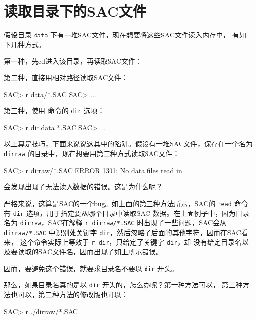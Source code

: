 \section{读取目录下的SAC文件}
\label{sec:read-dir}
假设目录 \texttt{data} 下有一堆SAC文件，现在想要将这些SAC文件读入内存中，
有如下几种方式。

第一种，先cd进入该目录，再读取SAC文件：

第二种，直接用相对路径读取SAC文件：
\begin{SACCode}
SAC> r data/*.SAC
SAC> ...
\end{SACCode}

第三种，使用 命令的 \texttt{dir} 选项：
\begin{SACCode}
SAC> r dir data *.SAC
SAC> ...
\end{SACCode}

以上算是技巧，下面来说说这其中的陷阱。假设有一堆SAC文件，保存在一个名为
\texttt{dirraw} 的目录中，现在想要用第二种方式读取SAC文件：
\begin{SACCode}
SAC> r dirraw/*.SAC
 ERROR 1301: No data files read in.
\end{SACCode}
会发现出现了无法读入数据的错误。这是为什么呢？

严格来说，这算是SAC的一个bug。如上面的第三种方法所示，SAC的
\texttt{read} 命令有 \texttt{dir} 选项，用于指定要从哪个目录中读取SAC
数据。在上面例子中，因为目录名为 \texttt{dirraw}，SAC在解释
\texttt{r dirraw/*.SAC} 时出现了一些问题，SAC会从 \texttt{dirraw/*.SAC}
中识别处关键字 \texttt{dir}，然后忽略了后面的其他字符，因而在SAC看来，
这个命令实际上等效于 \texttt{r dir}，只给定了关键字 \texttt{dir}，却
没有给定目录名以及要读取的SAC文件名，因而出现了如上所示错误。

因而，要避免这个错误，就要求目录名不要以 \texttt{dir} 开头。

那么，如果目录名真的是以 \texttt{dir} 开头的，怎么办呢？第一种方法可以，
第三种方法也可以，第二种方法的修改版也可以：
\begin{SACCode}
SAC> r ./dirraw/*.SAC
\end{SACCode}
